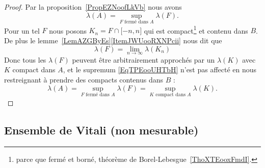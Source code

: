 \begin{proof}
    Par la proposition~\ref{PropEZNoofLkVb} nous avons
    \begin{equation}    \label{EqTPEooUHTbH}
        \lambda(A)=\sup_{ F\text{ fermé dans } A}\lambda(F).
    \end{equation}
    Pour un tel \( F\) nous posons \( K_n=F\cap\mathopen[ -n , n \mathclose]\) qui est compact\footnote{parce que fermé et borné, théorème de Borel-Lebesgue~\ref{ThoXTEooxFmdI}.} et contenu dans \( B\). De plus le lemme~\ref{LemAZGByEs}\ref{ItemJWUooRXNPcii} nous dit que
    \begin{equation}
        \lambda(F)=\lim_{n\to \infty} \lambda(K_n)
    \end{equation}
    Donc tous les \( \lambda(F)\) peuvent être arbitrairement approchés par un \( \lambda(K)\) avec \( K\) compact dans \( A\), et le supremum \eqref{EqTPEooUHTbH} n'est pas affecté en nous restreignant à prendre des compacts contenus dans \( B\) :
    \begin{equation}
        \lambda(A)=\sup_{ F\text{ fermé dans } A}\lambda(F)=\sup_{ K\text{ compact dans } A}\lambda(K).
    \end{equation}
\end{proof}

\subsection{Ensemble de Vitali (non mesurable)}

